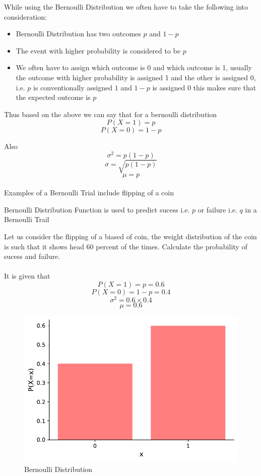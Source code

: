 \documentclass[twoside,12pt]{report}  %
\begin{document}
\vfill
\pagebreak

While using the Bernoulli Distribution we often have to take the following into consideration:
\begin{itemize}
	\item Bernoulli Distribution has two outcomes $p$ and $1-p$
	\item The event with higher probability is considered to be $p$
	\item We often have to assign which outcome is 0 and which outcome is 1, usually the outcome with higher probability is assigned 1 and the other is assigned 0, i.e. $p$ is conventionally assigned $1$ and $1-p$ is assigned $0$ this makes sure that the expected outcome is $p$
\end{itemize} 

Thus based on the above we can say that for a bernoulli distribution
$$ \boxed{P(X=1) = p} $$
$$ \boxed{P(X=0) = 1-p} $$

Also
$$ \boxed{\sigma^{2} = p(1-p)} $$
$$ \boxed{\sigma = \sqrt{p(1-p)}} $$
$$ \boxed{\mu = p} $$
\\
Examples of a Bernoulli Trial include flipping of a coin
\\
\begin{tcolorbox}[colback=red!5!white, colframe=red!75!black, title = \textbf{Bernoulli Distribution Function}]
	Bernoulli Distribution Function is used to predict sucess i.e. $p$ or failure i.e. $q$ in a Bernoulli Trail
\end{tcolorbox}

\vfill
\pagebreak

\begin{tcolorbox}[colback=blue!5!white, colframe=blue!75!black, title = \textbf{Bernoulli Distribution Function}]
	Let us consider the flipping of a biased of coin, the weight distribution of the coin is such that it shows head 60 percent of the times. Calculate the probability of sucess and failure.
	\\
	\\
	It is given that
	$$ P(X=1) = p = 0.6 $$
	$$ P(X=0) = 1-p = 0.4 $$
	$$ \sigma^{2} = 0.6 \times 0.4 $$
	$$ \mu = 0.6 $$
	
	\begin{figure}[H]
		\centering
		\includegraphics[width=0.5\linewidth]{./images/bernoulli_example.pdf}
		\caption{Bernoulli Distribution}
		\label{figure_bernoulli_example}
	\end{figure}

\end{tcolorbox}
\end{document}
